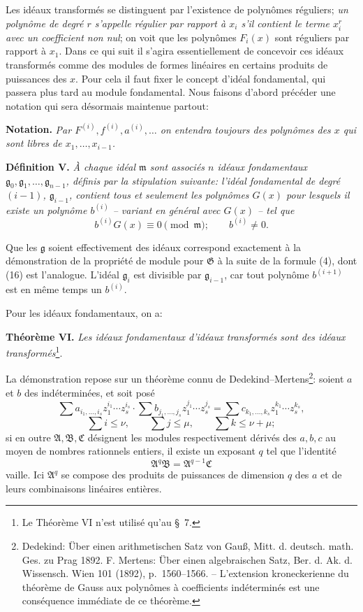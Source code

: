 \documentclass[11pt]{article}
\providecommand{\Amod}{\mathfrak A}
\providecommand{\Bmod}{\mathfrak B}
\providecommand{\Gmod}{\mathfrak G}
\providecommand{\mideal}{\mathfrak m}
\providecommand{\gideal}{\mathfrak g}
\providecommand{\zero}[1]{\equiv 0\pmod{#1}}
\begin{document}
Les idéaux transformés se distinguent par l'existence de polynômes réguliers; \emph{un polynôme de degré $r$ s'appelle régulier par rapport à $x_i$ s'il contient le terme $x_i^r$ avec un coefficient non nul}; on voit que les polynômes $F_i(x)$ sont réguliers par rapport à $x_1$. Dans ce qui suit il s'agira essentiellement de concevoir ces idéaux transformés comme des modules de formes linéaires en certains produits de puissances des $x$. Pour cela il faut fixer le concept d'idéal fondamental, qui passera plus tard au module fondamental. Nous faisons d'abord précéder une notation qui sera désormais maintenue partout:

\medskip
\noindent\textbf{Notation.} \emph{Par $F^{(i)},f^{(i)},a^{(i)},\ldots$ on entendra toujours des polynômes des $x$ qui sont libres de $x_1,
\ldots,x_{i-1}$.}

\medskip
\noindent\textbf{Définition V.} \emph{À chaque idéal $\mideal$ sont associés $n$ idéaux fondamentaux $\gideal_0,\gideal_1,\ldots,\gideal_{n-1}$, définis par la stipulation suivante: l'idéal fondamental de degré $(i-1)$, $\gideal_{i-1}$, contient tous et seulement les polynômes $G(x)$ pour lesquels il existe un polynôme $b^{(i)}$ -- variant en général avec $G(x)$ -- tel que}
\begin{equation}
 b^{(i)}G(x)\zero{\mideal};\qquad b^{(i)}\ne0.
\tag{16}
\end{equation}

Que les $\gideal$ soient effectivement des idéaux correspond exactement à la démonstration de la propriété de module pour $\Gmod$ à la suite de la formule (4), dont (16) est l'analogue. L'idéal $\gideal_i$ est divisible par $\gideal_{i-1}$, car tout polynôme $b^{(i+1)}$ est en même temps un $b^{(i)}$.

Pour les idéaux fondamentaux, on a:

\medskip
\noindent\textbf{Théorème VI.} \emph{Les idéaux fondamentaux d'idéaux transformés sont des idéaux transformés}\footnote{Le Théorème VI n'est utilisé qu'au \S{}~7.}.

La démonstration repose sur un théorème connu de Dedekind--Mertens\footnote{Dedekind: Über einen arithmetischen Satz von Gauß, Mitt. d. deutsch. math. Ges. zu Prag 1892. F. Mertens: Über einen algebraischen Satz, Ber. d. Ak. d. Wissensch. Wien 101 (1892), p.~1560--1566. -- L'extension kroneckerienne du théorème de Gauss aux polynômes à coefficients indéterminés est une conséquence immédiate de ce théorème.}: soient $a$ et $b$ des indéterminées, et soit posé
\[
 \sum a_{i_1,\ldots,i_s}z_1^{i_1}\cdots z_s^{i_s}\cdot
 \sum b_{j_1,\ldots,j_s}z_1^{j_1}\cdots z_s^{j_s}
 =
 \sum c_{k_1,\ldots,k_s}z_1^{k_1}\cdots z_s^{k_s},
\]
\[
 \sum i\le \nu,
 \qquad
 \sum j\le \mu,
 \qquad
 \sum k\le \nu+\mu;
\]
si en outre $\Amod,\Bmod,\mathfrak C$ désignent les modules respectivement dérivés des $a,b,c$ au moyen de nombres rationnels entiers, il existe un exposant $q$ tel que l'identité
\begin{equation}
 \Amod^q\Bmod=\Amod^{q-1}\mathfrak C
\tag{17}
\end{equation}
vaille. Ici $\Amod^q$ se compose des produits de puissances de dimension $q$ des $a$ et de leurs combinaisons linéaires entières.
\end{document}
